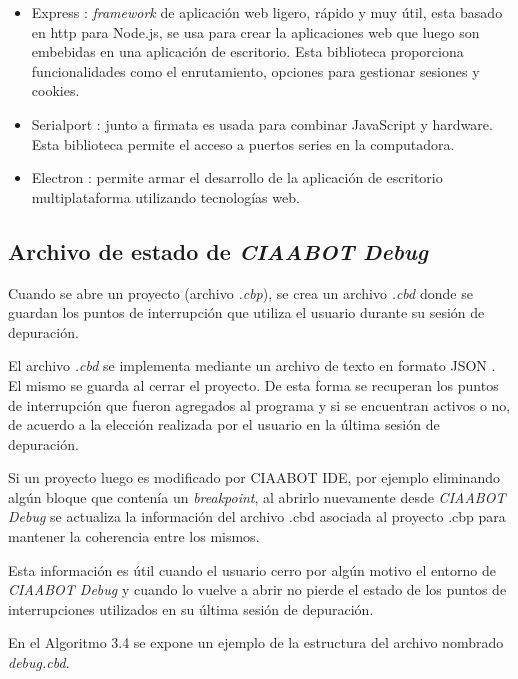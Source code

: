 \begin{itemize}
	\item Express \citep{express}: \emph{framework} de aplicación web ligero, rápido y muy útil, esta basado en http para Node.js, se usa para crear la aplicaciones web que luego son embebidas en una aplicación de escritorio. Esta biblioteca  proporciona funcionalidades como el enrutamiento, opciones para gestionar sesiones y cookies.
	
	\item Serialport \citep{serialport}: junto a firmata es usada para combinar JavaScript y hardware. Esta biblioteca permite el acceso a puertos series en la computadora.
	
	\item Electron \citep{electron}: permite armar el desarrollo de la aplicación de escritorio multiplataforma utilizando tecnologías web.
\end{itemize}


\subsection{Archivo de estado de \emph{CIAABOT Debug}}
\label{subsec:Archivo de CIAABOT Debug}

Cuando se abre un proyecto (archivo \emph{.cbp}), se crea un archivo \emph{.cbd} donde se guardan los puntos de interrupción que utiliza el usuario durante su sesión de depuración.

El archivo \emph{.cbd} se implementa mediante un archivo de texto en formato JSON \citep{json}. El mismo se guarda al cerrar el proyecto. De esta forma se recuperan los puntos de interrupción que fueron agregados al programa
y si se encuentran activos o no, de acuerdo a la elección realizada por el usuario en la última sesión de depuración. 

Si un proyecto luego es modificado por CIAABOT IDE, por ejemplo eliminando algún bloque que contenía un \emph{breakpoint}, al abrirlo nuevamente desde\emph{ CIAABOT Debug} se actualiza la información del archivo .cbd asociada al proyecto .cbp para mantener la coherencia entre los mismos.

Esta información es útil cuando el usuario cerro por algún motivo el entorno de \emph{CIAABOT Debug} y cuando lo vuelve a abrir no pierde el estado de los puntos de interrupciones utilizados en su última sesión de depuración.

En el Algoritmo 3.4 se expone un ejemplo de la estructura del archivo nombrado \emph{debug.cbd}.


